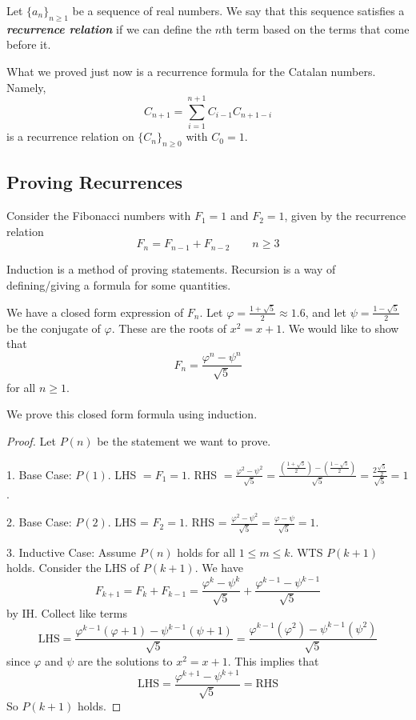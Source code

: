 \begin{definition}
    Let $\{a_n\}_{n\geq 1}$ be a sequence of real numbers. We say that this sequence satisfies a \textit{\textbf{recurrence relation}} if we can define the $n$th term based on the terms that come before it.
\end{definition}

What we proved just now is a recurrence formula for the Catalan numbers. Namely,
$$
C_{n+1} = \sum_{i=1}^{n+1} C_{i-1} C_{n+1-i}
$$
is a recurrence relation on $\{C_n\}_{n\geq 0}$ with $C_0 = 1$.

\subsection{Proving Recurrences}

Consider the Fibonacci numbers with $F_1 = 1$ and $F_2 = 1$, given by the recurrence relation
$$
F_n = F_{n-1} + F_{n-2} \qquad n \geq 3
$$

Induction is a method of proving statements. Recursion is a way of defining/giving a formula for some quantities.

\begin{example}
    We have a closed form expression of $F_n$. Let $\varphi = \frac{1+\sqrt{5}}{2} \approx 1.6$, and let $\psi = \frac{1-\sqrt{5}}{2}$ be the conjugate of $\varphi$. These are the roots of $x^2 = x + 1$. We would like to show that
    $$
    F_n = \frac{\varphi^{n} - \psi^{n}}{\sqrt{5}}
    $$ 
    for all $n \geq 1$.
\end{example}

We prove this closed form formula using induction.

\begin{proof}
    Let $P(n)$ be the statement we want to prove.

    1. Base Case: $P(1)$. LHS $= F_1 = 1$. RHS $= \frac{\varphi^2 - \psi^2}{\sqrt{5}} = \frac{\left( \frac{1+\sqrt{5}}{2}\right) - \left( \frac{1-\sqrt{5}}{2} \right)}{\sqrt{5}} = \frac{2 \frac{\sqrt{5}}{2}}{\sqrt{5}} = 1$.

    2. Base Case: $P(2)$. LHS = $F_2 = 1$. RHS = $\frac{\varphi^2 - \psi^2}{\sqrt{5}} = \frac{\varphi - \psi}{\sqrt{5}} = 1$.

    3. Inductive Case: Assume $P(n)$ holds for all $1 \leq m \leq k$. WTS $P(k+1)$ holds. Consider the LHS of $P(k+1)$. We have
    $$
    F_{k+1} = F_k + F_{k-1} = \frac{\varphi^k - \psi^k}{\sqrt{5}} + \frac{\varphi^{k-1} - \psi^{k-1}}{\sqrt{5}}
    $$
    by IH. Collect like terms
    $$
    \text{LHS} = \frac{\varphi^{k-1} (\varphi + 1) - \psi^{k-1}(\psi + 1)}{\sqrt{5}} = \frac{\varphi^{k-1}(\varphi^2) - \psi^{k-1}(\psi^2)}{\sqrt{5}}
    $$
    since $\varphi$ and $\psi$ are the solutions to $x^2 = x + 1$. This implies that
    $$
    \text{LHS} = \frac{\varphi^{k+1} - \psi^{k+1}}{\sqrt{5}} = \text{RHS}
    $$
    So $P(k+1)$ holds.
\end{proof}

